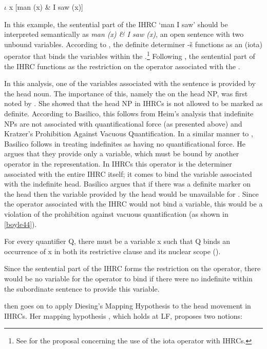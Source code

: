 \documentclass[output=paper]{LSP/langsci}
\begin{document}
\ea \label{boyle43}
 $\iota$ x [man (x) \& I saw (x)]  
\z

In this example, the sentential part of the IHRC `man I saw' should be interpreted semantically as \textit{man (x) \& I saw (x)}, an open sentence with two unbound variables.  According to \citeauthor{Basilico1996}, the definite determiner -\v{s} functions as an (iota) operator that binds the variables within the .\footnote{See \citet{Jelinek1987} for the proposal concerning the use of the iota operator with IHRCs.} Following \citet{Culy1990}, the sentential part of the IHRC functions as the restriction on the operator associated with the .  

In this analysis, one of the variables associated with the sentence is provided by the head noun. The importance of this, namely the  on the head NP, was first noted by \citet{Williamson1987}. She showed that the head NP in IHRCs is not allowed to be marked as definite. According to Basilico, this follows from Heim's \citeyearpar{Heim1982} analysis that indefinite NPs are not associated with quantificational force (as presented above) and Kratzer's \citeyearpar{Kratzer1989} Prohibition Against Vacuous Quantification. In a similar manner to \citet{Culy1990}, Basilico follows \citet{Heim1982} in treating indefinites as having no quantificational force. He argues that they provide only a variable, which must be bound by another operator in the representation. In IHRCs this operator is the determiner associated with the entire IHRC itself; it comes to bind the variable associated with the indefinite head. Basilico argues that if there was a definite marker on the head then the variable provided by the head would be unavailable for . Since the operator associated with the IHRC would not bind a variable, this would be a violation of the prohibition against vacuous quantification (as shown in \ref{boyle44}).

\ea For every quantifier Q, there must be a variable x such that Q binds an occurrence of x in both its restrictive clause and its nuclear scope (\citealt{Kratzer1989}). \label{boyle44} 
\z

Since the sentential part of the IHRC forms the restriction on the operator, there would be no variable for the operator to bind if there were no indefinite within the subordinate sentence to provide this variable.

\citeauthor{Basilico1996} then goes on to apply Diesing's \citeyearpar{Diesing1990, Diesing1992a, Diesing1992b} Mapping Hypothesis to the head movement in IHRCs. Her mapping hypothesis \citeyearpar{Diesing1992a, Diesing1992b}, which holds at LF, proposes two notions:
\end{document}

